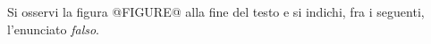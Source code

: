 Si osservi la figura @FIGURE@ alla fine del testo
e si indichi, fra i seguenti, l'enunciato \emph{falso}.